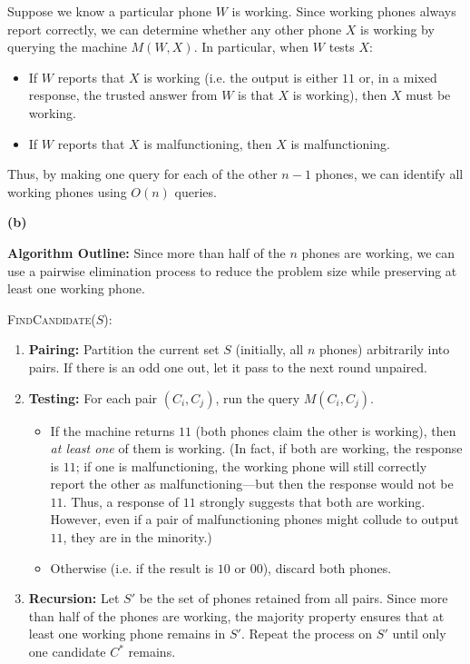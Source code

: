 \documentclass[11pt]{article}
\begin{document}
    Suppose we know a particular phone \(W\) is working. Since working phones always report correctly, we can determine whether any other phone \(X\) is working by querying the machine \(M(W,X)\). In particular, when \(W\) tests \(X\):
    \begin{itemize}
        \item If \(W\) reports that \(X\) is working (i.e. the output is either \(11\) or, in a mixed response, the trusted answer from \(W\) is that \(X\) is working), then \(X\) must be working.
        \item If \(W\) reports that \(X\) is malfunctioning, then \(X\) is malfunctioning.
    \end{itemize}
    Thus, by making one query for each of the other \(n-1\) phones, we can identify all working phones using \(O(n)\) queries.
    
    \bigskip
    
    \textbf{(b) }
    
    \textbf{Algorithm Outline:}  
    Since more than half of the \(n\) phones are working, we can use a pairwise elimination process to reduce the problem size while preserving at least one working phone.
    
    \medskip
    
    \textsc{FindCandidate}(\(S\)):
    \begin{enumerate}
        \item \textbf{Pairing:} Partition the current set \(S\) (initially, all \(n\) phones) arbitrarily into pairs. If there is an odd one out, let it pass to the next round unpaired.
        \item \textbf{Testing:} For each pair \((C_i, C_j)\), run the query \(M(C_i,C_j)\).  
        \begin{itemize}
            \item If the machine returns \(11\) (both phones claim the other is working), then \emph{at least one} of them is working. (In fact, if both are working, the response is \(11\); if one is malfunctioning, the working phone will still correctly report the other as malfunctioning—but then the response would not be \(11\). Thus, a response of \(11\) strongly suggests that both are working. However, even if a pair of malfunctioning phones might collude to output \(11\), they are in the minority.)
            \item Otherwise (i.e. if the result is \(10\) or \(00\)), discard both phones.
        \end{itemize}
        \item \textbf{Recursion:} Let \(S'\) be the set of phones retained from all pairs. Since more than half of the phones are working, the majority property ensures that at least one working phone remains in \(S'\). Repeat the process on \(S'\) until only one candidate \(C^*\) remains.
    \end{enumerate}
    
\end{document}
